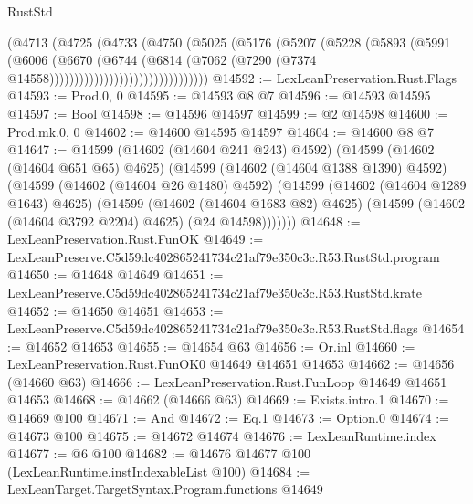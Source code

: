 \begin{lexlean}{RustStd}
\begin{coremodule}
                                  (@4713
                                    (@4725
                                      (@4733
                                        (@4750
                                          (@5025
                                            (@5176
                                              (@5207
                                                (@5228
                                                  (@5893
                                                    (@5991
                                                      (@6006
                                                        (@6670
                                                          (@6744
                                                            (@6814
                                                              (@7062
                                                                (@7290
                                                                  (@7374
                                                                    @14558))))))))))))))))))))))))))))))))
@14592 := LexLeanPreservation.Rust.Flags
@14593 := Prod.{0, 0}
@14595 := @14593 @8 @7
@14596 := @14593 @14595
@14597 := Bool
@14598 := @14596 @14597
@14599 := @2 @14598
@14600 := Prod.mk.{0, 0}
@14602 := @14600 @14595 @14597
@14604 := @14600 @8 @7
@14647 := @14599
    (@14602 (@14604 @241 @243) @4592)
    (@14599
      (@14602 (@14604 @651 @65) @4625)
      (@14599
        (@14602 (@14604 @1388 @1390) @4592)
        (@14599
          (@14602 (@14604 @26 @1480) @4592)
          (@14599
            (@14602 (@14604 @1289 @1643) @4625)
            (@14599
              (@14602 (@14604 @1683 @82) @4625)
              (@14599 (@14602 (@14604 @3792 @2204) @4625) (@24 @14598)))))))
@14648 := LexLeanPreservation.Rust.FunOK
@14649 := LexLeanPreserve.C5d59dc402865241734c21af79e350c3c.R53.RustStd.program
@14650 := @14648 @14649
@14651 := LexLeanPreserve.C5d59dc402865241734c21af79e350c3c.R53.RustStd.krate
@14652 := @14650 @14651
@14653 := LexLeanPreserve.C5d59dc402865241734c21af79e350c3c.R53.RustStd.flags
@14654 := @14652 @14653
@14655 := @14654 @63
@14656 := Or.inl
@14660 := LexLeanPreservation.Rust.FunOK0 @14649 @14651 @14653
@14662 := @14656 (@14660 @63)
@14666 := LexLeanPreservation.Rust.FunLoop @14649 @14651 @14653
@14668 := @14662 (@14666 @63)
@14669 := Exists.intro.{1}
@14670 := @14669 @100
@14671 := And
@14672 := Eq.{1}
@14673 := Option.{0}
@14674 := @14673 @100
@14675 := @14672 @14674
@14676 := LexLeanRuntime.index
@14677 := @6 @100
@14682 := @14676 @14677 @100 (LexLeanRuntime.instIndexableList @100)
@14684 := LexLeanTarget.TargetSyntax.Program.functions @14649

\end{coremodule}
\end{lexlean}
